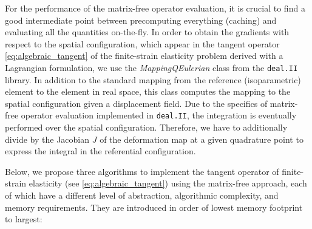 \documentclass[AMA,STIX1COL]{WileyNJD-v2}
\begin{document}
For the performance of the matrix-free operator evaluation, it is crucial to find a good intermediate point between precomputing everything (caching) and evaluating all the quantities on-the-fly.
%
In order to obtain the gradients with respect to the spatial configuration,
which appear in the tangent operator \eqref{eq:algebraic_tangent} of the finite-strain elasticity problem derived with a Lagrangian formulation,
we use the \textit{MappingQEulerian} class from the \texttt{deal.II} \cite{dealII90} library.
In addition to the standard mapping from the reference (isoparametric) element to the element in real space, this class computes the mapping to the spatial configuration given a displacement field.
%
Due to the specifics of matrix-free operator evaluation implemented in \texttt{deal.II}, the integration is eventually performed over the spatial configuration.
Therefore, we have to additionally divide by the Jacobian $J$ of the deformation map at a given quadrature point to express the integral in the referential configuration.

Below, we propose three algorithms to implement the tangent operator of finite-strain elasticity (see \eqref{eq:algebraic_tangent}) using the matrix-free approach, each of which have a different level of abstraction, algorithmic complexity, and memory requirements.
They are introduced in order of lowest memory footprint to largest:
\end{document}
